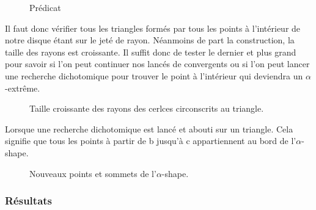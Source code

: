 \begin{figure}[h!]
  \centering
  \caption{Prédicat}
\end{figure}

Il faut donc vérifier tous les triangles formés par tous les points à l'intérieur de notre disque étant sur le jeté de rayon. Néanmoins de part la construction, la taille des rayons est croissante. Il suffit donc de tester le dernier et plus grand pour savoir si l'on peut continuer nos lancés de convergents ou si l'on peut lancer une recherche dichotomique pour trouver le point à l'intérieur qui deviendra un $\alpha$-extrême.

\begin{figure}[h!]
  \centering
  \caption{Taille croissante des rayons des cerlces circonscrits au triangle.}
\end{figure}

Lorsque une recherche dichotomique est lancé et abouti sur un triangle. Cela signifie que tous les points à partir de b jusqu'à c appartiennent au bord de l'$\alpha$-shape.

\begin{figure}[h!]
  \centering
  \caption{Nouveaux points et sommets de l'$\alpha$-shape.}
\end{figure}

\subsubsection{Résultats}

